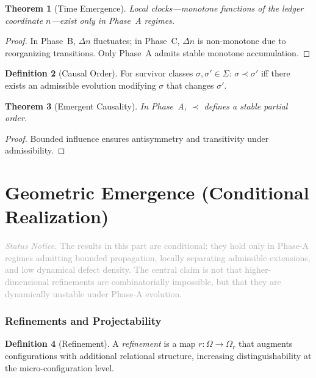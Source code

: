 \documentclass[11pt,a4paper]{article}
\newtheorem{theorem}{Theorem}[section]
\theoremstyle{definition}
\newtheorem{definition}[theorem]{Definition}
\theoremstyle{remark}
\newcommand{\statusnotice}[1]{%
  \medskip\noindent\textcolor{darkgray}{\textit{Status Notice.} #1}\medskip
}
\begin{document}
\begin{theorem}[Time Emergence]\label{thm:time}
Local clocks---monotone functions of the ledger coordinate $n$---exist only in Phase~A regimes.
\end{theorem}
\begin{proof}
In Phase~B, $\Delta n$ fluctuates; in Phase~C, $\Delta n$ is non-monotone due to reorganizing transitions. Only Phase~A admits stable monotone accumulation.
\end{proof}

\begin{definition}[Causal Order]\label{def:causal}
For survivor classes $\sigma, \sigma' \in \Sigma$: $\sigma \prec \sigma'$ iff there exists an admissible evolution modifying $\sigma$ that changes $\sigma'$.
\end{definition}

\begin{theorem}[Emergent Causality]\label{thm:causal}
In Phase~A, $\prec$ defines a stable partial order.
\end{theorem}
\begin{proof}
Bounded influence ensures antisymmetry and transitivity under admissibility.
\end{proof}


\part{Geometric Emergence (Conditional Realization)}

\statusnotice{The results in this part are conditional: they hold only in Phase-A regimes admitting bounded propagation, locally separating admissible extensions, and low dynamical defect density. The central claim is not that higher-dimensional refinements are combinatorially impossible, but that they are dynamically unstable under Phase-A evolution.}

\section{Refinements and Projectability}

\begin{definition}[Refinement]\label{def:refine}
A \emph{refinement} is a map $r \colon \Omega \to \Omega_r$ that augments configurations with additional relational structure, increasing distinguishability at the micro-configuration level.
\end{definition}
\end{document}
